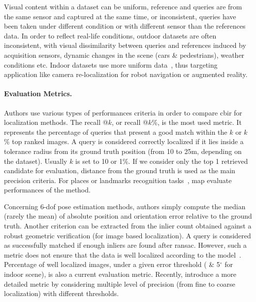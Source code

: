 		Visual content within a dataset can be uniform, reference and queries are from the same sensor and captured at the same time, or inconsistent, queries have been taken under different condition or with different sensor than the references data. In order to reflect real-life conditions, outdoor datasets are often inconsistent, with visual dissimilarity between queries and references induced by acquisition sensors, dynamic changes in the scene (cars \& pedestrians),  weather conditions etc. Indoor datasets use more uniform data~\citep{Shotton2013}, thus targeting application like camera re-localization for robot navigation or augmented reality.

		\paragraph{Evaluation Metrics.}
		\label{subsec:evaluation_metric}
			Authors use various types of performances criteria in order to compare \ac{cbir} for localization methods. The recall @$k$, or recall @$k$\%, is the most used metric. It represents the percentage of queries that present a good match within the $k$ or $k$\% top ranked images. A query is considered correctly localized if it lies inside a tolerance radius from its ground truth position (from 10 to 25m, depending on the dataset).  Usually $k$ is set to 10 or 1\%. If we consider only the top 1 retrieved candidate for evaluation, distance from the ground truth is used as the main precision criteria. For places or landmarks recognition tasks~\citep{Radenovic2018}, \ac{map} evaluate performances of the method.
			
			Concerning 6-\ac{dof} pose estimation methods, authors simply compute the median (rarely the mean) of absolute position and orientation error relative to the ground truth. Another criterion can be extracted from the inlier count obtained against a robust geometric verification (for image based localization). A query is considered as successfully matched if enough inliers are found after \ac{ransac}. However, such a metric does not ensure that the data is well localized according to the model~\citep{Sattler2015}. Percentage of well localized images, \ie under a given error threshold (\eg 5cm \& 5$^{\circ}$ for indoor scene), is also a current evaluation metric.  Recently, \citet{Sattler2018} introduce a more detailed metric by considering multiple level of precision (from fine to coarse localization) with different thresholds.
			
	 
			
